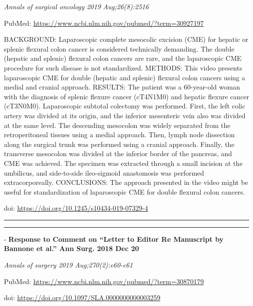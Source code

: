 \documentclass[]{article}
\begin{document}
\emph{Annals of surgical oncology 2019 Aug;26(8):2516}

PubMed: \url{https://www.ncbi.nlm.nih.gov/pubmed/?term=30927197}

BACKGROUND: Laparoscopic complete mesocolic excision (CME) for hepatic
or splenic flexural colon cancer is considered technically demanding.
The double (hepatic and splenic) flexural colon cancers are rare, and
the laparoscopic CME procedure for such disease is not standardized.
METHODS: This video presents laparoscopic CME for double (hepatic and
splenic) flexural colon cancers using a medial and cranial approach.
RESULTS: The patient was a 60-year-old woman with the diagnosis of
splenic flexure cancer (cT4N1M0) and hepatic flexure cancer (cT3N0M0).
Laparoscopic subtotal colectomy was performed. First, the left colic
artery was divided at its origin, and the inferior mesenteric vein also
was divided at the same level. The descending mesocolon was widely
separated from the retroperitoneal tissues using a medial approach.
Then, lymph node dissection along the surgical trunk was performed using
a cranial approach. Finally, the transverse mesocolon was divided at the
inferior border of the pancreas, and CME was achieved. The specimen was
extracted through a small incision at the umbilicus, and side-to-side
ileo-sigmoid anastomosis was performed extracorporeally. CONCLUSIONS:
The approach presented in the video might be useful for standardization
of laparoscopic CME for double flexural colon cancers.

doi: \url{https://doi.org/10.1245/s10434-019-07329-4}

{}

{}

\begin{center}\rule{0.5\linewidth}{\linethickness}\end{center}

\begin{center}\rule{0.5\linewidth}{\linethickness}\end{center}

 - \textbf{Response to Comment on ``Letter to Editor Re Manuscript by
Bannone et al.'' Ann Surg. 2018 Dec 20}

\emph{Annals of surgery 2019 Aug;270(2):e60-e61}

PubMed: \url{https://www.ncbi.nlm.nih.gov/pubmed/?term=30870179}

doi: \url{https://doi.org/10.1097/SLA.0000000000003259}

{}
\end{document}
